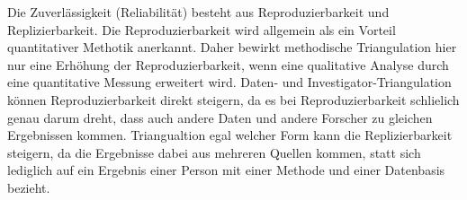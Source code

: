 Die Zuverlässigkeit (Reliabilität) besteht aus Reproduzierbarkeit und Replizierbarkeit. Die Reproduzierbarkeit wird allgemein als ein Vorteil quantitativer Methotik anerkannt. Daher bewirkt methodische Triangulation hier nur eine Erhöhung der Reproduzierbarkeit, wenn eine qualitative Analyse durch eine quantitative Messung erweitert wird. Daten- und Investigator-Triangulation können Reproduzierbarkeit direkt steigern, da es bei Reproduzierbarkeit schlielich genau darum dreht, dass auch andere Daten und andere Forscher zu gleichen Ergebnissen kommen. Triangualtion egal welcher Form kann die Replizierbarkeit steigern, da die Ergebnisse dabei aus mehreren Quellen kommen, statt sich lediglich auf ein Ergebnis einer Person mit einer Methode und einer Datenbasis bezieht.



